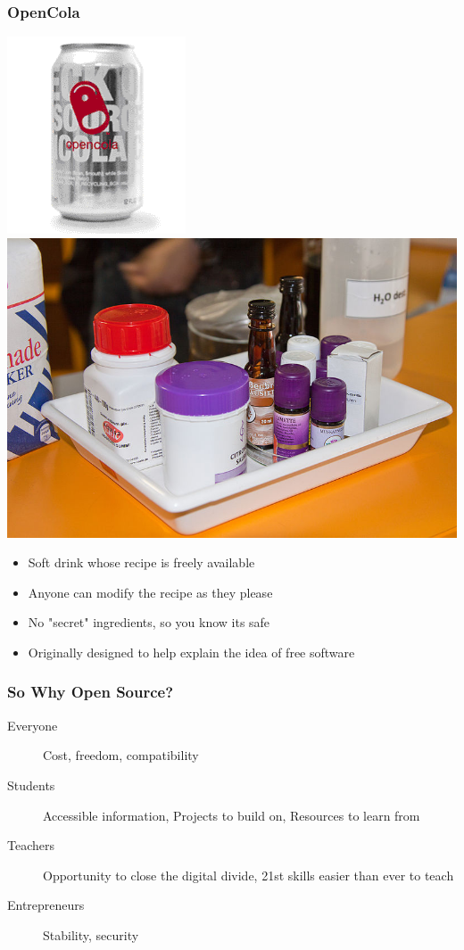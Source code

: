 \documentclass{beamer}
\begin{document}
\begin{frame}
  \frametitle{OpenCola}
  \begin{center} 
    \includegraphics[height=0.3\textheight]{../img/opencola} \hspace{2em} \includegraphics[height=0.3\textheight]{../img/opencola-ingredients} 
  \end{center}
  \begin{itemize}
  \item Soft drink whose recipe is freely available
  \item Anyone can modify the recipe as they please
  \item No "secret" ingredients, so you know its safe
  \item Originally designed to help explain the idea of free software
  \end{itemize}
\end{frame}


\begin{frame}
  \frametitle{So Why Open Source?}
  \begin{description}
  \item[Everyone] Cost, freedom, compatibility
  \item[Students] Accessible information, Projects to build on, Resources to learn from
  \item[Teachers] Opportunity to close the digital divide, 21st skills easier than ever to teach
  \item[Entrepreneurs] Stability, security
  \end{description}
\end{frame}
\end{document}
